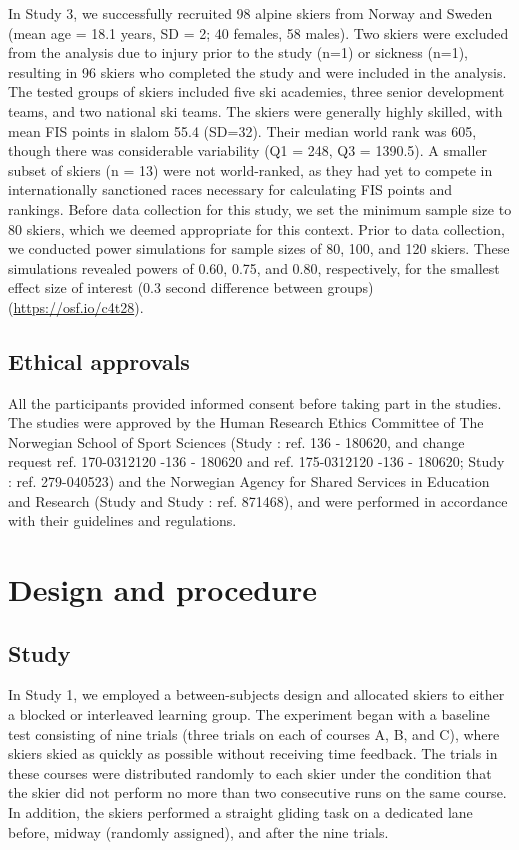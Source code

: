 In Study 3, we successfully recruited 98 alpine skiers from Norway and Sweden (mean age = 18.1 years, SD = 2; 40 females, 58 males). Two skiers were excluded from the analysis due to injury prior to the study (n=1) or sickness (n=1), resulting in 96 skiers who completed the study and were included in the analysis. The tested groups of skiers included five ski academies, three senior development teams, and two national ski teams. The skiers were generally highly skilled, with mean FIS points in slalom 55.4 (SD=32). Their median world rank was 605, though there was considerable variability (Q1 = 248, Q3 = 1390.5). A smaller subset of skiers (n = 13) were not world-ranked, as they had yet to compete in internationally sanctioned races necessary for calculating FIS points and rankings. Before data collection for this study, we set the minimum sample size to 80 skiers, which we deemed appropriate for this context. Prior to data collection, we conducted power simulations for sample sizes of 80, 100, and 120 skiers. These simulations revealed powers of 0.60, 0.75, and 0.80, respectively, for the smallest effect size of interest (0.3 second difference between groups) (\url{https://osf.io/c4t28}). 

\subsection{Ethical approvals}
All the participants provided informed consent before taking part in the studies. The studies were approved by the Human Research Ethics Committee of The Norwegian School of Sport Sciences (Study : ref. 136 - 180620, and change request ref. 170-0312120 -136 - 180620 and ref. 175-0312120 -136 - 180620; Study : ref. 279-040523) and the Norwegian Agency for Shared Services in Education and Research (Study  and Study : ref. 871468), and were performed in accordance with their guidelines and regulations.

\section{Design and procedure}

\subsection{Study }
In Study 1, we employed a between-subjects design and allocated skiers to either a blocked or interleaved learning group. The experiment began with a baseline test consisting of nine trials (three trials on each of courses A, B, and C), where skiers skied as quickly as possible without receiving time feedback. The trials in these courses were distributed randomly to each skier under the condition that the skier did not perform no more than two consecutive runs on the same course. In addition, the skiers performed a straight gliding task on a dedicated lane before, midway (randomly assigned), and after the nine trials.


